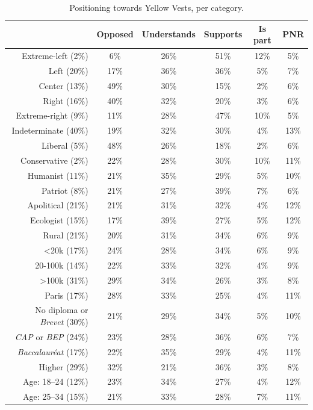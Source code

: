 \documentclass[english,5p,authoryear]{elsarticle}
\begin{document}
\begin{appendices}
\begin{spacing}{1.8}
\begin{table}[ht]
\centering
\caption{Positioning towards Yellow Vests, per category.}
{\fontsize{10}{16}\selectfont
\begin{tabular}{rccccc}
  \hline \hline
 & Opposed & Understands & Supports & Is part & PNR \\ 
  \hline
  Extreme-left (2\%) & 6\% & 26\% & 51\% & 12\% & 5\% \\ 
  Left (20\%) & 17\% & 36\% & 36\% & 5\% & 7\% \\ 
  Center (13\%) & 49\% & 30\% & 15\% & 2\% & 6\% \\ 
  Right (16\%) & 40\% & 32\% & 20\% & 3\% & 6\% \\ 
  Extreme-right (9\%) & 11\% & 28\% & 47\% & 10\% & 5\% \\
  Indeterminate (40\%) & 19\% & 32\% & 30\% & 4\% & 13\% \\
  \hline
  Liberal (5\%) & 48\% & 26\% & 18\% & 2\% & 6\% \\
  Conservative (2\%) & 22\% & 28\% & 30\% & 10\% & 11\% \\
  Humanist (11\%) & 21\% & 35\% & 29\% & 5\% & 10\% \\
  Patriot (8\%) & 21\% & 27\% & 39\% & 7\% & 6\% \\
  Apolitical (21\%) & 21\% & 31\% & 32\% & 4\% & 12\% \\
  Ecologist (15\%) & 17\% & 39\% & 27\% & 5\% & 12\% \\
  \hline
  Rural (21\%) & 20\% & 31\% & 34\% & 6\% & 9\% \\ 
  <20k (17\%) & 24\% & 28\% & 34\% & 6\% & 9\% \\ 
  20-100k (14\%) & 22\% & 33\% & 32\% & 4\% & 9\% \\ 
  >100k (31\%) & 29\% & 34\% & 26\% & 3\% & 8\% \\ 
  Paris (17\%) & 28\% & 33\% & 25\% & 4\% & 11\% \\
  \hline
  No diploma or \textit{Brevet} (30\%) & 21\% & 29\% & 34\% & 5\% & 10\% \\ 
  \textit{CAP} or \textit{BEP} (24\%) & 23\% & 28\% & 36\% & 6\% & 7\% \\ 
  \textit{Baccalauréat} (17\%) & 22\% & 35\% & 29\% & 4\% & 11\% \\ 
  Higher (29\%) & 32\% & 21\% & 36\% & 3\% & 8\% \\
  \hline
  Age: 18--24 (12\%) & 23\% & 34\% & 27\% & 4\% & 12\% \\ 
  Age: 25--34 (15\%) & 21\% & 33\% & 28\% & 7\% & 11\% \\ 

\end{tabular}}
\end{table}
\end{spacing}
\end{appendices}
\end{document}
